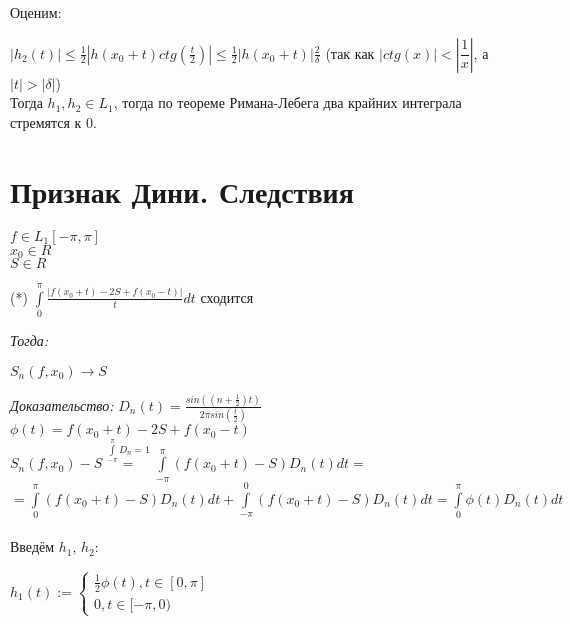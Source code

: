 \documentclass[paper=a4, fontsize=17pt]{article}
\begin{document}
Оценим:

$ |h_2(t)| \leq \frac{1}{2} |h(x_0 + t) ctg(\frac{t}{2})| \leq \frac{1}{2} |h(x_0 + t)| \frac{2}{\delta} $ (так как $|ctg(x)| < |\dfrac{1}{x}|$, а $|t| > |\delta|$)\\

Тогда $h_1, h_2 \in L_1$, тогда по теореме Римана-Лебега два крайних интеграла стремятся к 0.

\section{Признак Дини. Следствия}

$ f \in L_1[-\pi, \pi] $\\
$ x_0 \in R $\\
$ S \in R $

(*) $ \int\limits_{0}^{\pi} \frac{|f(x_0 + t) - 2S + f(x_0 - t)|}{t} dt $ сходится

\emph{Тогда:}

$ S_n(f, x_0) \to S $

\emph{Доказательство:}
$ D_n(t) = \frac{sin((n + \frac{1}{2})t)}{2\pi sin(\frac{t}{2})} $\\
$ \phi(t) = f(x_0 + t) - 2S + f(x_0 - t) $\\
$ S_n(f, x_0) - S \overset{\int\limits_{-\pi}^{\pi}D_n = 1}{=} \int\limits_{-\pi}^{\pi} (f(x_0 + t) - S) D_n(t) dt =$\\
$ = \int\limits_{0}^{\pi} (f(x_0 + t) - S) D_n(t) dt + \int\limits_{-\pi}^{0} (f(x_0 + t) - S) D_n(t) dt
 = \int\limits_{0}^{\pi} \phi(t) D_n(t) dt $
\\\\
Введём $h_1$, $h_2$:

$ h_1(t) := 
    \begin{cases}
        \frac{1}{2} \phi(t), t \in [0, \pi] \\
        0, t \in [-\pi,0)
    \end{cases}
$
\end{document}
